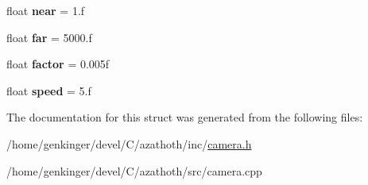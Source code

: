 \begin{DoxyCompactItemize}
\item 
\mbox{\label{structCamera_ad96efd3e1e4ec33dddb1d25f05d02ff2}} 
float {\bfseries near} = 1.f
\item 
\mbox{\label{structCamera_a9f30b77edf6485e001a98d21ff5f17fe}} 
float {\bfseries far} = 5000.f
\item 
\mbox{\label{structCamera_a5c9e3aadcdb71da95aaa1610fbeaa343}} 
float {\bfseries factor} = 0.\+005f
\item 
\mbox{\label{structCamera_a2960f533df18fe6d7d574c316c6d217a}} 
float {\bfseries speed} = 5.f
\end{DoxyCompactItemize}


The documentation for this struct was generated from the following files\+:\begin{DoxyCompactItemize}
\item 
/home/genkinger/devel/\+C/azathoth/inc/\mbox{\hyperlink{camera_8h}{camera.\+h}}\item 
/home/genkinger/devel/\+C/azathoth/src/camera.\+cpp\end{DoxyCompactItemize}
